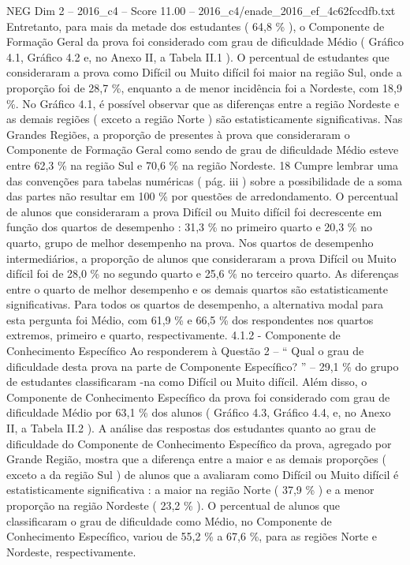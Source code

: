 \begin{textsample}{NEG Dim 2 – 2016\_c4 – Score 11.00 – 2016\_c4/enade\_2016\_ef\_4c62fccdfb.txt}
Entretanto, para mais da metade dos estudantes ( 64,8 \% ), o Componente de Formação Geral da prova foi considerado com grau de dificuldade Médio ( Gráfico 4.1, Gráfico 4.2 e, no Anexo II, a Tabela II.1 ).
O percentual de estudantes que consideraram a prova como Difícil ou Muito difícil foi maior na região Sul, onde a proporção foi de 28,7 \%, enquanto a de menor incidência foi a Nordeste, com 18,9 \%.
No Gráfico 4.1, é possível observar que as diferenças entre a região Nordeste e as demais regiões ( exceto a região Norte ) são estatisticamente significativas.
Nas Grandes Regiões, a proporção de presentes à prova que consideraram o Componente de Formação Geral como sendo de grau de dificuldade Médio esteve entre 62,3 \% na região Sul e 70,6 \% na região Nordeste. 18 Cumpre lembrar uma das convenções para tabelas numéricas ( pág. iii ) sobre a possibilidade de a soma das partes não resultar em 100 \% por questões de arredondamento.
O percentual de alunos que consideraram a prova Difícil ou Muito difícil foi decrescente em função dos quartos de desempenho : 31,3 \% no primeiro quarto e 20,3 \% no quarto, grupo de melhor desempenho na prova.
Nos quartos de desempenho intermediários, a proporção de alunos que consideraram a prova Difícil ou Muito difícil foi de 28,0 \% no segundo quarto e 25,6 \% no terceiro quarto.
As diferenças entre o quarto de melhor desempenho e os demais quartos são estatisticamente significativas.
Para todos os quartos de desempenho, a alternativa modal para esta pergunta foi Médio, com 61,9 \% e 66,5 \% dos respondentes nos quartos extremos, primeiro e quarto, respectivamente. 4.1.2 - Componente de Conhecimento Específico Ao responderem à Questão 2 – “ Qual o grau de dificuldade desta prova na parte de Componente Específico? ” – 29,1 \% do grupo de estudantes classificaram -na como Difícil ou Muito difícil.
Além disso, o Componente de Conhecimento Específico da prova foi considerado com grau de dificuldade Médio por 63,1 \% dos alunos ( Gráfico 4.3, Gráfico 4.4, e, no Anexo II, a Tabela II.2 ).
A análise das respostas dos estudantes quanto ao grau de dificuldade do Componente de Conhecimento Específico da prova, agregado por Grande Região, mostra que a diferença entre a maior e as demais proporções ( exceto a da região Sul ) de alunos que a avaliaram como Difícil ou Muito difícil é estatisticamente significativa : a maior na região Norte ( 37,9 \% ) e a menor proporção na região Nordeste ( 23,2 \% ).
O percentual de alunos que classificaram o grau de dificuldade como Médio, no Componente de Conhecimento Específico, variou de 55,2 \% a 67,6 \%, para as regiões Norte e Nordeste, respectivamente.

\end{textsample}
